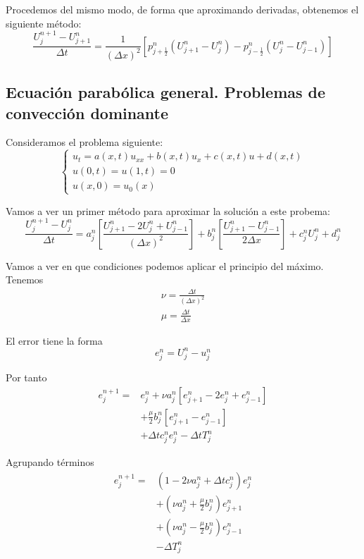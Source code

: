 Procedemos del mismo modo, de forma que aproximando derivadas, obtenemos el siguiente método:
$$\frac{U_{j}^{n+1}-U_{j+1}^{n}}{\Delta t} = \frac{1}{(\Delta x)^2}\left[p_{j+\frac{1}{2}}^n(U_{j+1}^{n} - U_{j}^{n}) - p_{j-\frac{1}{2}}^n(U_{j}^{n}-U_{j-1}^{n}) \right]$$


\subsection{Ecuación parabólica general. Problemas de convección dominante}
Consideramos el problema siguiente:
\begin{equation*}
	\left\{
	\begin{array}{l}
		u_t = a(x,t)u_{xx}+b(x,t)u_x+c(x,t)u+d(x,t)\\
		u(0,t) = u(1,t) = 0\\
		u(x,0) = u_0(x)
	\end{array}
	\right.
\end{equation*}

Vamos a ver un primer método para aproximar la solución a este probema:
\begin{equation*}
	\frac{U_{j}^{n+1}-U_{j}^{n}}{\Delta t} = a_j^n\left[\frac{U_{j+1}^{n}-2U_{j}^{n}+U_{j-1}^{n}}{(\Delta x )^2}\right]+b_j^n\left[\frac{U_{j+1}^{n}-U_{j-1}^{n}}{2\Delta x}\right]+c_j^nU_{j}^{n}+d_j^n
\end{equation*}

Vamos a ver en que condiciones podemos aplicar el principio del máximo.
Tenemos
\begin{equation*}
	\begin{array}{l}
		\nu = \frac{\Delta t}{(\Delta x )^2}\\
		\mu = \frac{\Delta t}{\Delta x}
	\end{array}
\end{equation*}

El error tiene la forma
$$e_j^n = U_j^n -u_j^n$$

Por tanto
\begin{align*}
	e_j^{n+1} = & e_j^n + \nu a_j^n\left[e_{j+1}^{n}-2e_{j}^{n}+e_{j-1}^{n}\right]\\
	& + \frac{\mu}{2}b_j^n\left[e_{j+1}^{n}-e_{j-1}^{n}\right]\\
	& + \Delta t c_j^ne_j^n - \Delta t T_j^n
\end{align*}

Agrupando términos
\begin{align*}
	e_j^{n+1} = & (1-2\nu a_j^n + \Delta t c_j^n)e_j^n\\
	& + (\nu a_j^n +\frac{\mu}{2}b_j^n)e_{j+1}^n\\
	& + (\nu a_j^n - \frac{\mu}{2}b_j^n)e_{j-1}^n\\
	& - \Delta T_j^n
\end{align*}

